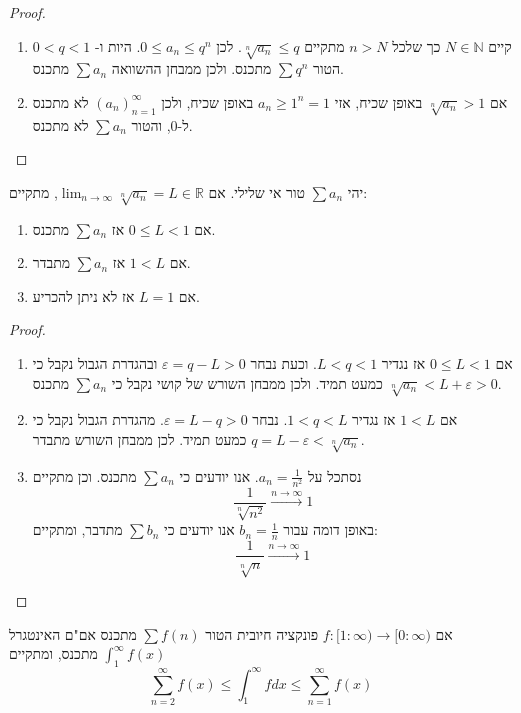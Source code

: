 \documentclass{tstextbook}
\begin{document}
\begin{proof}
  \begin{enumerate}
    \item קיים \(N \in \mathbb{N}\) כך שלכל \(n > N\) מתקיים \(\sqrt[n]{ a_{n} }\leq q\). לכן \(0\leq a_{n}\leq q^{n}\). היות ו- \(0<q< 1\) הטור \(\sum q^{n}\) מתכנס. ולכן ממבחן ההשוואה \(\sum a_{n}\) מתכנס. 


    \item אם \(\sqrt[n]{ a_{n} }> 1\) באופן שכיח, אזי \(a_{n}\geq 1^{n}=1\) באופן שכיח, ולכן \((a_n)_{n=1}^\infty\) לא מתכנס ל-0, והטור \(\sum a_{n}\) לא מתכנס. 


  \end{enumerate}
\end{proof}
\begin{proposition}
יהי \(\sum a_{n}\) טור אי שלילי. אם \(\lim_{ n \to \infty } \sqrt[n]{ a_{n} }=L \in \mathbb{R}\), מתקיים:

  \begin{enumerate}
    \item אם \(0\leq L < 1\) אז \(\sum a_{n}\) מתכנס. 


    \item אם \(1< L\) אז \(\sum a_{n}\) מתבדר. 


    \item אם \(L=1\) אז לא ניתן להכריע. 


  \end{enumerate}
\end{proposition}
\begin{proof}
  \begin{enumerate}
    \item אם \(0\leq L< 1\) אז נגדיר \(L<q<1\). וכעת נבחר \(\varepsilon=q-L> 0\) ובהגדרת הגבול נקבל כי \(\sqrt[n]{ a_{n} }<L+\varepsilon>0\) כמעט תמיד. ולכן ממבחן השורש של קושי נקבל כי \(\sum a_{n}\) מתכנס. 


    \item אם \(1< L\)  אז נגדיר \(1<q<L\). נבחר \(\varepsilon=L-q>0\). מהגדרת הגבול נקבל כי \(q=L-\varepsilon<\sqrt[n]{ a_{n} }\) כמעט תמיד. לכן ממבחן השורש מתבדר. 


    \item נסתכל על \(a_{n}=\frac{1}{n^{2}}\). אנו יודעים כי \(\sum a_{n}\) מתכנס. וכן מתקיים\\
$$\frac{1}{\sqrt[n]{ n^{2} }} \xrightarrow{n\to \infty}1$$
באופן דומה עבור \(b_{n}=\frac{1}{n}\) אנו יודעים כי \(\sum b_{n}\) מתדבר, ומתקיים:
$$\frac{1}{\sqrt[n]{ n }}\xrightarrow{n\to \infty} 1$$


  \end{enumerate}
\end{proof}
\begin{proposition}
אם \(f:[1:\infty)\rightarrow [0:\infty)\)  פונקציה חיובית
הטור \(\sum f(n)\) מתכנס אם"ם האינטגרל \(\int_1^\infty f(x)\) מתכנס, ומתקיים $$\sum_{n=2}^\infty f(x) \leq \int_1^\infty f dx \leq \sum_{n=1}^\infty f(x) $$

\end{proposition}
\end{document}
